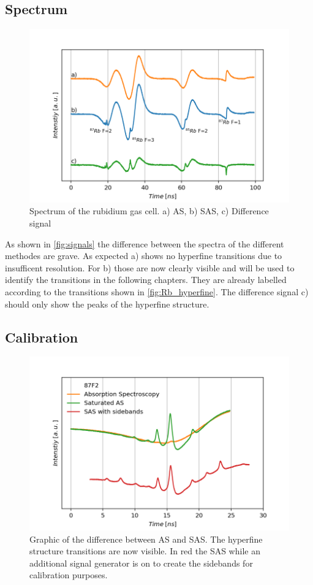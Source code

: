 \documentclass[]{article}
\begin{document}
\subsection{Spectrum}
\begin{figure}[H]
\centering
\includegraphics[width=.8\textwidth]{Plots/Diff_Signal.png}
\caption{Spectrum of the rubidium gas cell. a) AS, b) SAS, c) Difference signal}
\label{fig:signals}
\end{figure}

As shown in \autoref{fig:signals} the difference between the spectra of the different methodes are grave. As expected a) shows no hyperfine transitions due to insufficent resolution. For b) those are now clearly visible and will be used to identify the transitions in the following chapters. They are already labelled according to the transitions shown in \ref{fig:Rb_hyperfine}.
The difference signal c) should only show the peaks of the hyperfine structure.

\subsection{Calibration}
\begin{figure}[H]
\centering
\includegraphics[width=.8\textwidth]{Plots/Calibration_Second_All.png}
\caption{Graphic of the difference between AS and SAS. The hyperfine structure transitions are now visible. In red the SAS while an additional signal generator is on to create the sidebands for calibration purposes.}
\label{fig:all}
\end{figure}
\end{document}

